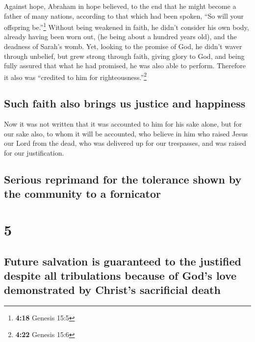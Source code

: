  Against hope, Abraham in hope believed, to the end that
he might become a father of many nations, according to that which had
been spoken, ``So will your offspring be.''\footnote{\textbf{4:18}
  Genesis 15:5}  Without being weakened in faith, he
didn't consider his own body, already having been worn out, (he being
about a hundred years old), and the deadness of Sarah's womb.
 Yet, looking to the promise of God, he didn't waver
through unbelief, but grew strong through faith, giving glory to God,
 and being fully assured that what he had promised, he
was also able to perform.  Therefore it also was
``credited to him for righteousness.''\footnote{\textbf{4:22} Genesis
  15:6}

\hypertarget{such-faith-also-brings-us-justice-and-happiness}{%
\subsection{Such faith also brings us justice and
happiness}\label{such-faith-also-brings-us-justice-and-happiness}}

 Now it was not written that it was accounted to him for
his sake alone,  but for our sake also, to whom it will
be accounted, who believe in him who raised Jesus our Lord from the
dead,  who was delivered up for our trespasses, and was
raised for our justification.

\hypertarget{serious-reprimand-for-the-tolerance-shown-by-the-community-to-a-fornicator}{%
\subsection{Serious reprimand for the tolerance shown by the community
to a
fornicator}\label{serious-reprimand-for-the-tolerance-shown-by-the-community-to-a-fornicator}}

\hypertarget{section-4}{%
\section{5}\label{section-4}}

\hypertarget{future-salvation-is-guaranteed-to-the-justified-despite-all-tribulations-because-of-gods-love-demonstrated-by-christs-sacrificial-death}{%
\subsection{Future salvation is guaranteed to the justified despite all
tribulations because of God's love demonstrated by Christ's sacrificial
death}\label{future-salvation-is-guaranteed-to-the-justified-despite-all-tribulations-because-of-gods-love-demonstrated-by-christs-sacrificial-death}}

